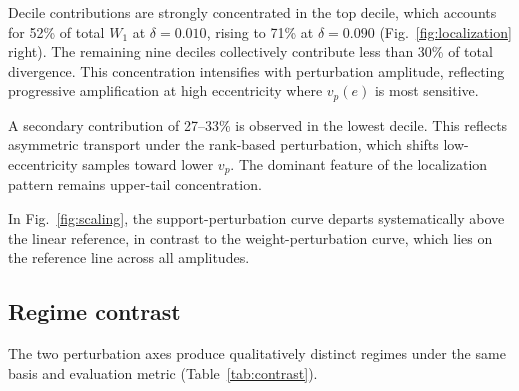 \documentclass[a4paper,fleqn,usenatbib]{mnras}
\begin{document}
Decile contributions are strongly concentrated in the top decile, which
accounts for 52\% of total $W_1$ at $\delta = 0.010$, rising to 71\% at
$\delta = 0.090$ (Fig.~\ref{fig:localization} right). The remaining nine
deciles collectively contribute less than 30\% of total divergence. This
concentration intensifies with perturbation amplitude, reflecting progressive
amplification at high eccentricity where $v_p(e)$ is most sensitive.

A secondary contribution of 27--33\% is observed in the lowest decile. This
reflects asymmetric transport under the rank-based perturbation, which shifts
low-eccentricity samples toward lower $v_p$. The dominant feature of the
localization pattern remains upper-tail concentration.

In Fig.~\ref{fig:scaling}, the support-perturbation curve departs
systematically above the linear reference, in contrast to the
weight-perturbation curve, which lies on the reference line across all
amplitudes.

\subsection{Regime contrast}
\label{sec:contrast}

The two perturbation axes produce qualitatively distinct regimes under the
same basis and evaluation metric (Table~\ref{tab:contrast}).

\begin{table}
  \centering
  \caption{Regime contrast between perturbation axes.}
  \label{tab:contrast}
\end{table}

\end{document}
